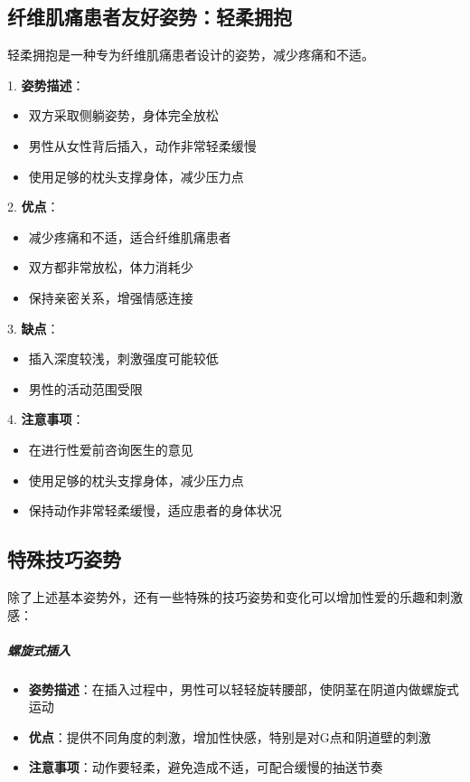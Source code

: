 \documentclass[12pt,UTF8]{ctexbook}
\begin{document}
\subsection{纤维肌痛患者友好姿势：轻柔拥抱}

轻柔拥抱是一种专为纤维肌痛患者设计的姿势，减少疼痛和不适。

1. \textbf{姿势描述}：
  \begin{itemize}
  \item 双方采取侧躺姿势，身体完全放松
  \item 男性从女性背后插入，动作非常轻柔缓慢
  \item 使用足够的枕头支撑身体，减少压力点
  \end{itemize}

2. \textbf{优点}：
  \begin{itemize}
  \item 减少疼痛和不适，适合纤维肌痛患者
  \item 双方都非常放松，体力消耗少
  \item 保持亲密关系，增强情感连接
  \end{itemize}

3. \textbf{缺点}：
  \begin{itemize}
  \item 插入深度较浅，刺激强度可能较低
  \item 男性的活动范围受限
  \end{itemize}

4. \textbf{注意事项}：
  \begin{itemize}
  \item 在进行性爱前咨询医生的意见
  \item 使用足够的枕头支撑身体，减少压力点
  \item 保持动作非常轻柔缓慢，适应患者的身体状况
  \end{itemize}

\subsection{特殊技巧姿势}

除了上述基本姿势外，还有一些特殊的技巧姿势和变化可以增加性爱的乐趣和刺激感：

\subparagraph{螺旋式插入}
\begin{itemize}
\item \textbf{姿势描述}：在插入过程中，男性可以轻轻旋转腰部，使阴茎在阴道内做螺旋式运动
\item \textbf{优点}：提供不同角度的刺激，增加性快感，特别是对G点和阴道壁的刺激
\item \textbf{注意事项}：动作要轻柔，避免造成不适，可配合缓慢的抽送节奏
\end{itemize}
\end{document}
